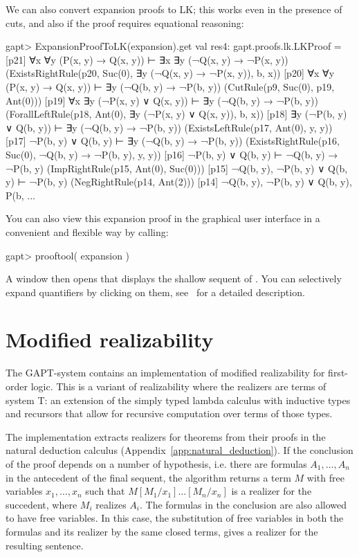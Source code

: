 \documentclass[a4paper,11pt]{book}
\newcommand{\cli}[1]{{\ttfamily {#1}}}
\begin{document}
We can also convert expansion proofs to LK; this works even in the presence of
cuts, and also if the proof requires equational reasoning:
\begin{clilisting}
gapt> ExpansionProofToLK(expansion).get
val res4: gapt.proofs.lk.LKProof =
[p21] ∀x ∀y (P(x, y) → Q(x, y)) ⊢ ∃x ∃y (¬Q(x, y) → ¬P(x, y))    (ExistsRightRule(p20, Suc(0), ∃y (¬Q(x, y) → ¬P(x, y)), b, x))
[p20] ∀x ∀y (P(x, y) → Q(x, y)) ⊢ ∃y (¬Q(b, y) → ¬P(b, y))    (CutRule(p9, Suc(0), p19, Ant(0)))
[p19] ∀x ∃y (¬P(x, y) ∨ Q(x, y)) ⊢ ∃y (¬Q(b, y) → ¬P(b, y))    (ForallLeftRule(p18, Ant(0), ∃y (¬P(x, y) ∨ Q(x, y)), b, x))
[p18] ∃y (¬P(b, y) ∨ Q(b, y)) ⊢ ∃y (¬Q(b, y) → ¬P(b, y))    (ExistsLeftRule(p17, Ant(0), y, y))
[p17] ¬P(b, y) ∨ Q(b, y) ⊢ ∃y (¬Q(b, y) → ¬P(b, y))    (ExistsRightRule(p16, Suc(0), ¬Q(b, y) → ¬P(b, y), y, y))
[p16] ¬P(b, y) ∨ Q(b, y) ⊢ ¬Q(b, y) → ¬P(b, y)    (ImpRightRule(p15, Ant(0), Suc(0)))
[p15] ¬Q(b, y), ¬P(b, y) ∨ Q(b, y) ⊢ ¬P(b, y)    (NegRightRule(p14, Ant(2)))
[p14] ¬Q(b, y), ¬P(b, y) ∨ Q(b, y), P(b, ...

\end{clilisting}

You can also view this expansion proof in the graphical user interface in
a convenient and flexible way by calling:
\begin{clilisting}
gapt> prooftool( expansion )

\end{clilisting}

A window then opens that displays the shallow sequent of \cli{expansion}.  You
can selectively expand quantifiers by clicking on them,
see~\cite{Hetzl13Understanding} for a detailed description.

\section{Modified realizability}

The GAPT-system contains an implementation of modified realizability for first-order logic. This is a variant of realizability where the realizers are terms of system T: an extension of the simply typed lambda calculus with inductive types and recursors that allow for recursive computation over terms of those types. 

The implementation extracts realizers for theorems from their proofs in the natural deduction calculus (Appendix~\ref{app:natural_deduction}). If the conclusion of the proof depends on a number of hypothesis, i.e. there are formulas $A_1,\dots,A_n$ in the antecedent of the final sequent, the algorithm returns a term $M$ with free variables  $x_1,\dots,x_n$ such that $M[M_1/x_1]\dots[M_n/x_n]$ is a realizer for the succedent, where $M_i$ realizes $A_i$. The formulas in the conclusion are also allowed to have free variables. In this case, the substitution of free variables in both the formulas and its realizer by the same closed terms, gives a realizer for the resulting sentence.
\end{document}
